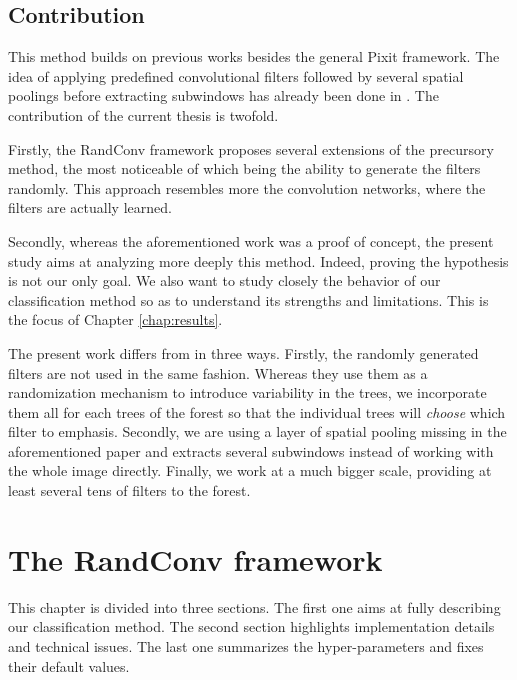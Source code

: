 \documentclass[a4paper]{report}
\begin{document}
	\section{Contribution}
	This method builds on previous works besides the general Pixit framework. The idea of applying predefined convolutional filters followed by several spatial poolings before extracting subwindows has already been done in \cite{base}.
	The contribution of the current thesis is twofold.
	\par
	Firstly, the RandConv framework proposes several extensions of the precursory method, the most noticeable of which being the ability to generate the filters randomly. This approach resembles more the convolution networks, where the filters are actually learned.
	\par
	Secondly, whereas the aforementioned work was a proof of concept, the present study aims at analyzing more deeply this method. Indeed, proving the hypothesis is not our only goal. We also want to study closely the behavior of our classification method so as to understand its strengths and limitations. This is the focus of Chapter \ref{chap:results}.
	\par
	The present work differs from \cite{NearlySame} in three ways. Firstly, the randomly generated filters are not used in the same fashion. Whereas they use them as a randomization mechanism to introduce variability in the trees, we incorporate them all for each trees of the forest so that the individual trees will \textit{choose} which filter to emphasis. Secondly, we are using a layer of spatial pooling missing in the aforementioned paper and extracts several subwindows instead of working with the whole image directly. Finally, we work at a much bigger scale, providing at least several tens of filters to the forest. 














\chapter{\label{chap:RandConv}The RandConv framework}
This chapter is divided into three sections. The first one aims at fully describing our classification method. The second section highlights implementation details and technical issues. The last one summarizes the hyper-parameters and fixes their default values.
\end{document}
